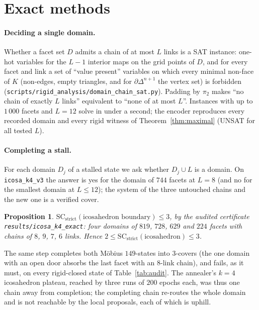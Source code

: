 \documentclass[12pt]{article}
\newcommand{\SC}{\mathrm{SC}}
\newcommand{\SCst}{\SC_{\mathrm{strict}}}
\newtheorem{proposition}[theo]{Proposition}
\begin{document}
\section{Exact methods}\label{sec:exact}

\paragraph{Deciding a single domain.}  Whether a facet set $D$ admits a
chain of at most $L$ links is a SAT instance: one-hot variables for the
$L-1$ interior maps on the grid points of $D$, and for every facet and link a
set of ``value present'' variables on which every minimal non-face of $K$
(non-edges, empty triangles, and for $\partial\Delta^{n+1}$ the vertex set)
is forbidden (\texttt{scripts/rigid\_analysis/domain\_chain\_sat.py}).
Padding by $\pi_2$ makes ``no chain of exactly $L$ links'' equivalent to
``none of at most $L$''.  Instances with up to $1\,000$ facets and $L=12$
solve in under a second; the encoder reproduces every recorded domain and
every rigid witness of Theorem~\ref{thm:maximal} (UNSAT for all tested $L$).

\paragraph{Completing a stall.}  For each domain $D_j$ of a stalled state we
ask whether $D_j\cup L$ is a domain.  On \texttt{icosa\_k4\_v3} the answer is
yes for the domain of $744$ facets at $L=8$ (and no for the smallest domain
at $L\le12$); the system of the three untouched chains and the new one is a
verified cover.

\begin{proposition}\label{prop:icosa}
$\SCst(\text{icosahedron boundary})\le3$, by the audited certificate
\texttt{results/icosa\_k4\_exact}: four domains of $819$, $728$, $629$ and
$224$ facets with chains of $8$, $9$, $7$, $6$ links.  Hence
$2\le\SCst(\text{icosahedron})\le3$.
\end{proposition}

The same step completes both M\"obius $149$-states into $3$-covers (the
one domain with an open door absorbs the last facet with an $8$-link chain),
and fails, as it must, on every rigid-closed state of Table~\ref{tab:audit}.
The annealer's $k=4$ icosahedron plateau, reached by three runs of $200$
epochs each, was thus one chain away from completion; the completing chain
re-routes the whole domain and is not reachable by the local proposals, each
of which is uphill.
\end{document}
